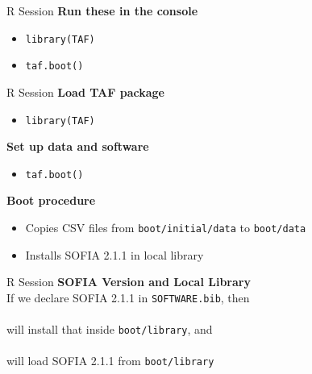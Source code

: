 \documentclass[aspectratio=169]{beamer}
\begin{document}

\begin{frame}[fragile]{R Session}
  \textbf{\darkgreen Run these in the console}\\[0.3ex]
  \begin{itemize}
    \item[] \verb|library(TAF)|\\[1ex]
    \item[] \verb|taf.boot()|\\[1ex]
  \end{itemize}
\end{frame}


\begin{frame}[fragile]{R Session}
  \textbf{\darkgreen Load TAF package}
  \begin{itemize}
    \item[] \verb|library(TAF)|\\[1ex]
  \end{itemize}
  \vspace{3ex}
  \textbf{\darkgreen Set up data and software}
  \begin{itemize}
    \item[] \verb|taf.boot()|\\[1ex]
  \end{itemize}
  \vspace{3ex}
  \textbf{\darkgreen Boot procedure}\\[0.3ex]
  \begin{itemize}
    \item[] Copies CSV files from \verb|boot/initial/data| to
    \verb|boot/data|\\[1.2ex]
    \item[] Installs SOFIA 2.1.1 in local library\\[1ex]
  \end{itemize}
\end{frame}


\begin{frame}{R Session}
  \textbf{\darkgreen SOFIA Version and Local Library}\\[1.5ex]
  If we declare SOFIA 2.1.1 in {\tt SOFTWARE.bib}, then\\[1ex]
  \\[1ex]
  will {\darkgreen install} that inside {\tt boot/library}, and\\[1ex]
  \\[1ex]
  will {\darkgreen load} SOFIA 2.1.1 from {\tt boot/library}
\end{frame}
\end{document}
